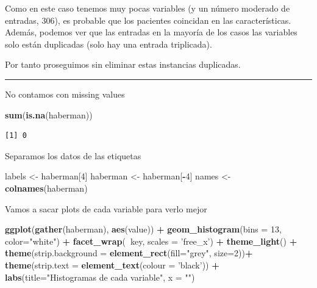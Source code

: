 \documentclass[
]{article}
\newenvironment{Shaded}{\begin{snugshade}}{\end{snugshade}}
\newcommand{\DataTypeTok}[1]{\textcolor[rgb]{0.13,0.29,0.53}{#1}}
\newcommand{\DecValTok}[1]{\textcolor[rgb]{0.00,0.00,0.81}{#1}}
\newcommand{\KeywordTok}[1]{\textcolor[rgb]{0.13,0.29,0.53}{\textbf{#1}}}
\newcommand{\NormalTok}[1]{#1}
\newcommand{\OperatorTok}[1]{\textcolor[rgb]{0.81,0.36,0.00}{\textbf{#1}}}
\newcommand{\StringTok}[1]{\textcolor[rgb]{0.31,0.60,0.02}{#1}}
\begin{document}
Como en este caso tenemos muy pocas variables (y un número moderado de
entradas, 306), es probable que los pacientes coincidan en las
características. Además, podemos ver que las entradas en la mayoría de
los casos las variables solo están duplicadas (solo hay una entrada
triplicada).

Por tanto proseguimos sin eliminar estas instancias duplicadas.

\begin{center}\rule{0.5\linewidth}{0.5pt}\end{center}

No contamos con missing values

\begin{Shaded}
\begin{Highlighting}[]
\KeywordTok{sum}\NormalTok{(}\KeywordTok{is.na}\NormalTok{(haberman))}
\end{Highlighting}
\end{Shaded}

\begin{verbatim}
[1] 0
\end{verbatim}

Separamos los datos de las etiquetas

\begin{Shaded}
\begin{Highlighting}[]
\NormalTok{labels <-}\StringTok{ }\NormalTok{haberman[}\DecValTok{4}\NormalTok{]}
\NormalTok{haberman <-}\StringTok{ }\NormalTok{haberman[}\OperatorTok{-}\DecValTok{4}\NormalTok{]}
\NormalTok{names <-}\StringTok{ }\KeywordTok{colnames}\NormalTok{(haberman)}
\end{Highlighting}
\end{Shaded}

Vamos a sacar plots de cada variable para verlo mejor

\begin{Shaded}
\begin{Highlighting}[]
\KeywordTok{ggplot}\NormalTok{(}\KeywordTok{gather}\NormalTok{(haberman), }\KeywordTok{aes}\NormalTok{(value)) }\OperatorTok{+}
\StringTok{  }\KeywordTok{geom_histogram}\NormalTok{(}\DataTypeTok{bins =} \DecValTok{13}\NormalTok{, }\DataTypeTok{color=}\StringTok{"white"}\NormalTok{) }\OperatorTok{+}
\StringTok{  }\KeywordTok{facet_wrap}\NormalTok{(}\OperatorTok{~}\NormalTok{key, }\DataTypeTok{scales =} \StringTok{'free_x'}\NormalTok{) }\OperatorTok{+}
\StringTok{  }\KeywordTok{theme_light}\NormalTok{() }\OperatorTok{+}
\StringTok{  }\KeywordTok{theme}\NormalTok{(}\DataTypeTok{strip.background =} \KeywordTok{element_rect}\NormalTok{(}\DataTypeTok{fill=}\StringTok{"grey"}\NormalTok{, }\DataTypeTok{size=}\DecValTok{2}\NormalTok{))}\OperatorTok{+}
\StringTok{  }\KeywordTok{theme}\NormalTok{(}\DataTypeTok{strip.text =} \KeywordTok{element_text}\NormalTok{(}\DataTypeTok{colour =} \StringTok{'black'}\NormalTok{)) }\OperatorTok{+}
\StringTok{  }\KeywordTok{labs}\NormalTok{(}\DataTypeTok{title=}\StringTok{"Histogramas de cada variable"}\NormalTok{, }\DataTypeTok{x =} \StringTok{""}\NormalTok{)}
\end{Highlighting}
\end{Shaded}
\end{document}
